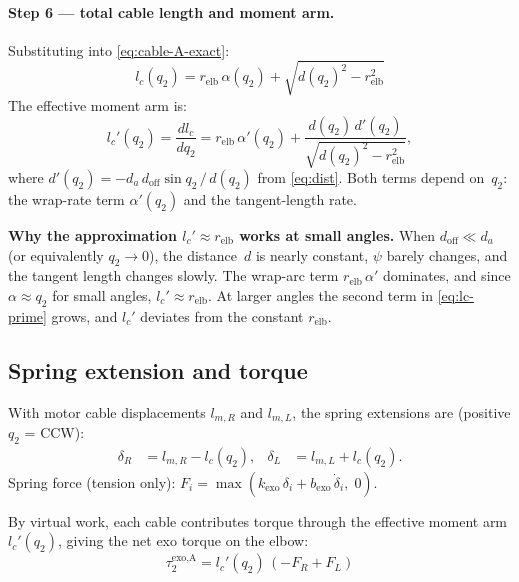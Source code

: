 \documentclass[11pt, a4paper]{article}
\begin{document}
\paragraph{Step 6 --- total cable length and moment arm.}
Substituting into \eqref{eq:cable-A-exact}:
%
\begin{equation}\label{eq:lc-full}
    \boxed{l_c(q_2)
    = r_{\text{elb}}\,\alpha(q_2)
    + \sqrt{d(q_2)^2 - r_{\text{elb}}^2}}
\end{equation}
%
The effective moment arm is:
%
\begin{equation}\label{eq:lc-prime}
    l_c'(q_2) = \frac{dl_c}{dq_2}
    = r_{\text{elb}}\,\alpha'(q_2)
    + \frac{d(q_2)\,d'(q_2)}{\sqrt{d(q_2)^2 - r_{\text{elb}}^2}},
\end{equation}
%
where $d'(q_2) = -d_a\,d_{\text{off}}\sin q_2 \,/\, d(q_2)$ from
\eqref{eq:dist}.  Both terms depend on~$q_2$: the wrap-rate term
$\alpha'(q_2)$ and the tangent-length rate.

\begin{mdframed}
\textbf{Why the approximation $l_c' \approx r_{\text{elb}}$ works at small
angles.}\;
When $d_{\text{off}} \ll d_a$ (or equivalently $q_2 \to 0$), the
distance~$d$ is nearly constant, $\psi$ barely changes, and the tangent
length changes slowly.  The wrap-arc term $r_{\text{elb}}\,\alpha'$
dominates, and since $\alpha \approx q_2$ for small angles,
$l_c' \approx r_{\text{elb}}$.  At larger angles the second term in
\eqref{eq:lc-prime} grows, and $l_c'$ deviates from the constant
$r_{\text{elb}}$.
\end{mdframed}

\subsection{Spring extension and torque}

With motor cable displacements $l_{m,R}$ and $l_{m,L}$, the spring
extensions are (positive $q_2$ = CCW):
%
\begin{align}\label{eq:delta_A}
    \delta_R &= l_{m,R} - l_c(q_2), &
    \delta_L &= l_{m,L} + l_c(q_2).
\end{align}
%
Spring force (tension only):
$F_i = \max(k_{\text{exo}}\,\delta_i + b_{\text{exo}}\,\dot{\delta}_i,\; 0)$.

\medskip\noindent
By virtual work, each cable contributes torque through the effective moment
arm $l_c'(q_2)$, giving the net exo torque on the elbow:
%
\begin{equation}\label{eq:tau_A}
    \boxed{\tau_2^{\text{exo,A}} = l_c'(q_2)\,(-F_R + F_L)}
\end{equation}
\end{document}
